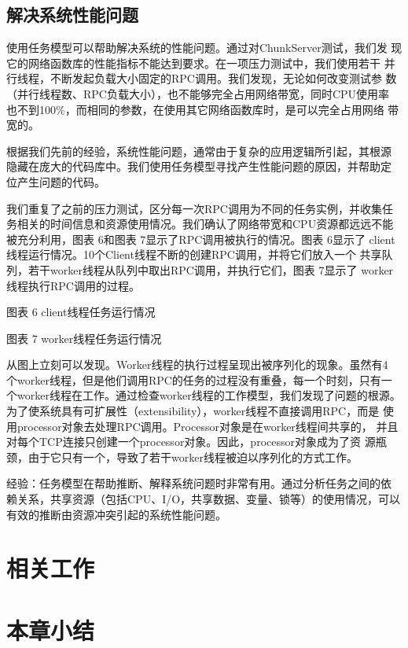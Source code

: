 \subsection{解决系统性能问题}

使用任务模型可以帮助解决系统的性能问题。通过对ChunkServer测试，我们发
现它的网络函数库的性能指标不能达到要求。在一项压力测试中，我们使用若干
并行线程，不断发起负载大小固定的RPC调用。我们发现，无论如何改变测试参
数（并行线程数、RPC负载大小），也不能够完全占用网络带宽，同时CPU使用率
也不到100\%，而相同的参数，在使用其它网络函数库时，是可以完全占用网络
带宽的。

根据我们先前的经验，系统性能问题，通常由于复杂的应用逻辑所引起，其根源
隐藏在庞大的代码库中。我们使用任务模型寻找产生性能问题的原因，并帮助定
位产生问题的代码。

我们重复了之前的压力测试，区分每一次RPC调用为不同的任务实例，并收集任
务相关的时间信息和资源使用情况。我们确认了网络带宽和CPU资源都远远不能
被充分利用，图表 6和图表 7显示了RPC调用被执行的情况。图表 6显示了
client线程运行情况。10个Client线程不断的创建RPC调用，并将它们放入一个
共享队列，若干worker线程从队列中取出RPC调用，并执行它们，图表 7显示了
worker线程执行RPC调用的过程。

 
图表 6 client线程任务运行情况

 
图表 7 worker线程任务运行情况

从图上立刻可以发现。Worker线程的执行过程呈现出被序列化的现象。虽然有4
个worker线程，但是他们调用RPC的任务的过程没有重叠，每一个时刻，只有一
个worker线程在工作。通过检查worker线程的工作模型，我们发现了问题的根源。
为了使系统具有可扩展性（extensibility），worker线程不直接调用RPC，而是
使用processor对象去处理RPC调用。Processor对象是在worker线程间共享的，
并且对每个TCP连接只创建一个processor对象。因此，processor对象成为了资
源瓶颈，由于它只有一个，导致了若干worker线程被迫以序列化的方式工作。

经验：任务模型在帮助推断、解释系统问题时非常有用。通过分析任务之间的依
赖关系，共享资源（包括CPU、I/O，共享数据、变量、锁等）的使用情况，可以
有效的推断由资源冲突引起的系统性能问题。



\section{相关工作}

\section{本章小结}

